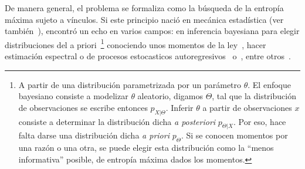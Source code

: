 De manera general, el problema se  formaliza como la b\'usqueda de la entrop\'ia
m\'axima  sujeto  a  v\'inculos.    Si  este  principio  naci\'o  en  mec\'anica
estad\'istica  (ver  tambi\'en~\cite{Jay57,   Jay57:2,  Jay65,  Mer10,  Mer18}),
encontr\'o  un  echo en  varios  campos:  en  inferencia bayesiana  para  elegir
distribuciones   del   a  priori~\footnote{A   partir   de  una   distribuci\'on
  parametrizada por  un par\'ametro $\theta$.   El enfoque bayesiano  consiste a
  modelizar $\theta$  aleatorio, digamos $\Theta$, tal que  la distribuci\'on de
  observaciones se  escribe entonces $p_{X|\Theta}$.  Inferir  $\theta$ a partir
  de  observaciones $x$  consiste a  determinar la  distribuci\'on dicha  {\it a
    posteriori} $p_{\Theta|X}$.   Por eso,  hace falta darse  una distribuci\'on
  dicha {\it a priori} $p_\Theta$.  Si se conocen momentos por una raz\'on o una
  otra,  se  puede elegir  esta  distribuci\'on  como  la ``menos  informativa''
  posible, \ie de  entrop\'ia m\'axima dados los momentos.\label{foot:SZ:Prior}}
conociendo  unos momentos  de la  ley~\cite{Rob07, Jay68,  Jay82,  Csi91}, hacer
estimaci\'on  espectral o  de procesos  estocasticos autoregresivos~\cite{Bur67,
  Bur75,  Jay82} o~\cite[cap.~12]{CovTho06},  entre  otros~\cite[\& ref.]{Arn01,
  Kap89, KapKes92}.

